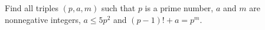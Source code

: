 Find all triples \((p, a, m)\) such that \(p\) is a prime number, \(a\) and \(m\) are nonnegative integers, $a\leq 5p^2$ and $(p-1)!+a=p^m$.
